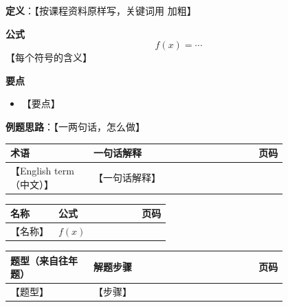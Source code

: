 \textbf{定义}：【按课程资料原样写，关键词用 \kw{} 加粗】

\textbf{公式}
\[ f(x) = \cdots \]
【每个符号的含义】

\textbf{要点}
\begin{itemize}
\item 【要点】
\end{itemize}

\textbf{例题思路}：【一两句话，怎么做】

\begin{longtable}{@{}p{0.3\linewidth}p{0.5\linewidth}r@{}}
\toprule
术语 & 一句话解释 & 页码 \\
\midrule
\endhead
【English term（中文）】 & 【一句话解释】 & \pageref{sec:k1} \\
\bottomrule
\end{longtable}

\begin{longtable}{@{}p{0.3\linewidth}p{0.5\linewidth}r@{}}
\toprule
名称 & 公式 & 页码 \\
\midrule
\endhead
【名称】 & $f(x)$ & \pageref{sec:k1} \\
\bottomrule
\end{longtable}

\begin{longtable}{@{}p{0.3\linewidth}p{0.5\linewidth}r@{}}
\toprule
题型（来自往年题） & 解题步骤 & 页码 \\
\midrule
\endhead
【题型】 & 【步骤】 & \pageref{sec:k1} \\
\bottomrule
\end{longtable}


